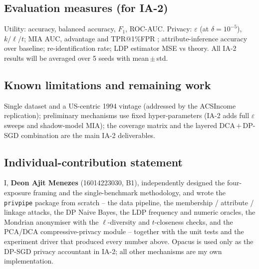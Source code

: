 \documentclass[11pt,a4paper]{article}
\begin{document}
\subsection{Evaluation measures (for IA-2)}
Utility: accuracy, balanced accuracy, $F_1$, ROC-AUC. Privacy: $\varepsilon$
(at $\delta=10^{-5}$), $k/\ell/t$; MIA AUC, advantage and TPR@1\%FPR
\citep{carlini2022membership}; attribute-inference accuracy over baseline;
re-identification rate; LDP estimator MSE vs theory. All IA-2 results will be
averaged over 5 seeds with mean\,$\pm$\,std.

\subsection{Known limitations and remaining work}
Single dataset and a US-centric 1994 vintage (addressed by the ACSIncome
replication); preliminary mechanisms use fixed hyper-parameters (IA-2 adds full
$\varepsilon$ sweeps and shadow-model MIA); the coverage matrix and the layered
DCA\,$+$\,DP-SGD combination are the main IA-2 deliverables.

\subsection{Individual-contribution statement}
\begin{shaded}\small
\noindent I, \textbf{Deon Ajit Menezes} (16014223030, B1), independently designed the
four-exposure framing and the single-benchmark methodology, and wrote the
\texttt{privpipe} package from scratch -- the data pipeline, the membership /
attribute / linkage attacks, the DP Naive Bayes, the LDP frequency and numeric
oracles, the Mondrian anonymiser with the $\ell$-diversity and $t$-closeness
checks, and the PCA/DCA compressive-privacy module -- together with the unit tests
and the experiment driver that produced every number above. Opacus is used only as
the DP-SGD privacy accountant in IA-2; all other mechanisms are my own
implementation.
\end{shaded}



\end{document}
